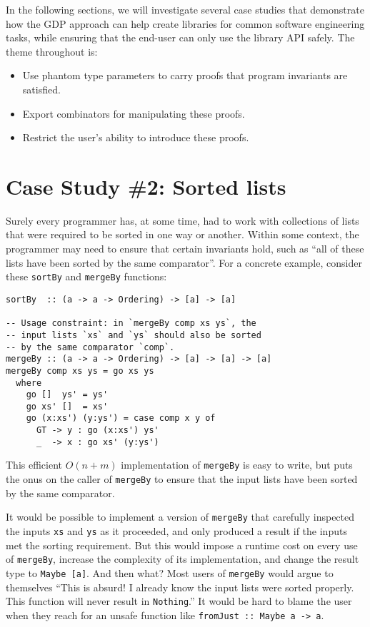 \documentclass[format=sigplan, review=false, screen=true]{acmart}
\begin{document}
In the following sections, we will investigate several case studies that
demonstrate how the GDP approach can help create libraries for common
software engineering tasks, while ensuring that the end-user can only
use the library API safely. The theme throughout is:
\begin{itemize}
\item Use phantom type parameters to carry proofs that program invariants are satisfied.
\item Export combinators for manipulating these proofs.
\item Restrict the user's ability to introduce these proofs.
\end{itemize}

\section{Case Study \#2: Sorted lists}

Surely every programmer has, at some time, had to work with collections of
lists that were required to be sorted in one way or another. Within some
context, the programmer may need to ensure that certain invariants hold, such
as ``all of these lists have been sorted by the same comparator''. For a concrete
example, consider these \texttt{sortBy} and \texttt{mergeBy} functions:
\begin{verbatim}
sortBy  :: (a -> a -> Ordering) -> [a] -> [a]

-- Usage constraint: in `mergeBy comp xs ys`, the
-- input lists `xs` and `ys` should also be sorted
-- by the same comparator `comp`.
mergeBy :: (a -> a -> Ordering) -> [a] -> [a] -> [a]
mergeBy comp xs ys = go xs ys
  where
    go []  ys' = ys'
    go xs' []  = xs'
    go (x:xs') (y:ys') = case comp x y of
      GT -> y : go (x:xs') ys'
      _  -> x : go xs' (y:ys')
\end{verbatim}
This efficient $O(n+m)$ implementation of \texttt{mergeBy} is easy to write,
but puts the onus on the caller of \texttt{mergeBy} to ensure that the
input lists have been sorted by the same comparator.

It would be possible to implement a version of \texttt{mergeBy} that
carefully inspected the inputs \texttt{xs} and \texttt{ys} as it
proceeded, and only produced a result if the inputs met the sorting
requirement. But this would impose a runtime cost on every use of
\texttt{mergeBy}, increase the complexity of its implementation,
and change the result type to \texttt{Maybe [a]}. And then what?
Most users of \texttt{mergeBy} would argue to themselves ``This is
absurd! I already know the input lists were sorted properly. This
function will never result in \texttt{Nothing}.'' It would be hard
to blame the user when they reach for an  unsafe function like
\texttt{fromJust :: Maybe a -> a}.
\end{document}
